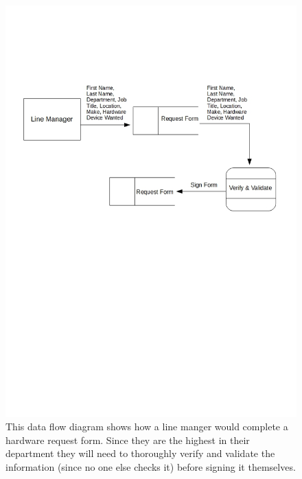 \begin{figure}[H]
\includegraphics[width=\textwidth]{dtd1.jpg}
\caption{This data flow diagram shows how a line manger would complete a hardware request form. Since they are the highest in their department they will need to thoroughly verify and validate the information (since no one else checks it) before signing it themselves.} \label{Page1Interview}
\end{figure}

